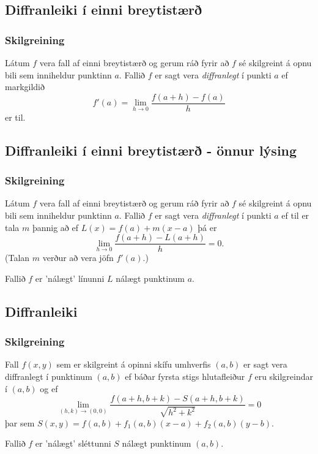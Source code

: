\subsection{Diffranleiki í einni breytistærð} 

\subsubsection{Skilgreining  }
  Látum $f$ vera fall af einni breytistærð og gerum ráð fyrir að $f$ sé
skilgreint á opnu bili sem inniheldur punktinn $a$.  Fallið $f$ er
sagt vera {\em diffranlegt} í punkti $a$ ef markgildið
$$f'(a)=\lim_{h\rightarrow 0}\frac{f(a+h)-f(a)}{h}$$
er til.



\subsection{Diffranleiki í einni breytistærð - önnur lýsing} 

\subsubsection{Skilgreining  }
Látum $f$ vera fall af einni breytistærð og gerum ráð fyrir að $f$ sé
skilgreint á opnu bili sem inniheldur punktinn $a$.  Fallið $f$ er
sagt vera {\em diffranlegt} í punkti $a$ ef til er tala $m$ þannig að
ef $L(x)=f(a)+m(x-a)$ þá er 
$$\lim_{h\rightarrow 0}\frac{f(a+h)-L(a+h)}{h}=0.$$
(Talan $m$ verður að vera jöfn $f'(a)$.)


\bigskip
Fallið $f$ er 'nálægt' línunni $L$ nálægt punktinum $a$.


\subsection{Diffranleiki} 

\subsubsection{Skilgreining }
Fall $f(x,y)$ sem er skilgreint á opinni
skífu umhverfis $(a,b)$ er sagt vera diffranlegt í punktinum $(a,b)$
ef báðar fyrsta stigs hlutafleiður $f$ eru skilgreindar í $(a,b)$ og ef 
$$\lim_{(h,k)\rightarrow (0,0)}
\frac{f(a+h, b+k)-S(a+h,b+k)}{\sqrt{h^2+k^2}}=0$$
þar sem $S(x,y) = f(a,b) + f_1(a,b)(x-a)+f_2(a,b)(y-b)$.

\bigskip
Fallið $f$ er 'nálægt' sléttunni $S$ nálægt punktinum $(a,b)$.



